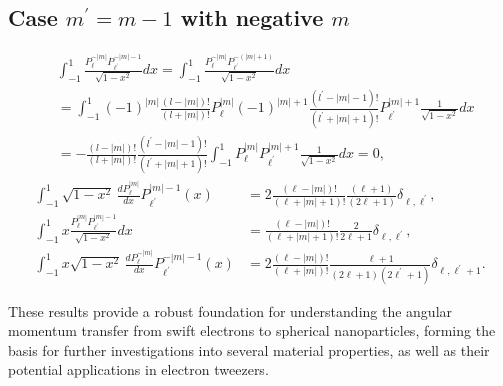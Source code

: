 \subsection{Case $m^{\prime}= m - 1$ with negative $m$}
\begin{align}
    &\int_{-1}^{1} \frac{P_{\ell}^{-|m|} P_{\ell^{\prime}}^{-|m|-1}}{\sqrt{1-x^2}} dx = \int_{-1}^{1} \frac{P_{\ell}^{-|m|} P_{\ell^{\prime}}^{-(|m|+1)}}{\sqrt{1-x^2}} dx \\
    &= \int_{-1}^{1} (-1)^|m| \frac{(l-|m|)!}{(l+|m|)!} P_{\ell}^{|m|} (-1)^{|m|+1} \frac{(l^{\prime}-|m|-1)!}{(l^{\prime}+|m|+1)!} P_{\ell^{\prime}}^{|m|+1} \frac{1}{\sqrt{1-x^2}} dx \\
    &= - \frac{(l-|m|)!}{(l+|m|)!} \frac{(l^{\prime}-|m|-1)!}{(l^{\prime}+|m|+1)!}  \int_{-1}^{1}   P_{\ell}^{|m|} P_{\ell^{\prime}}^{|m|+1} \frac{1}{\sqrt{1-x^2}} dx =0, 
\end{align}
\begin{align}
    \int_{-1}^{1} \sqrt{1-x^2} \,\frac{dP_{\ell}^{|m|}}{dx} P_{\ell^{\prime}}^{|m|-1} (x) &= 2 \frac{(\ell-|m|)!}{(\ell+|m|+1)!}\frac{(\ell+1)}{(2\ell+1)}\delta_{\ell,\ell^{\prime}},\\
    \int_{-1}^{1} x \frac{P_{\ell}^{|m|} P_{\ell^{\prime}}^{|m|-1}}{\sqrt{1-x^2}} dx &= \frac{(\ell-|m|)!}{(\ell+|m|+1)!}\frac{2}{2\ell+1}\delta_{\ell,\ell^{\prime}},\\
    \int_{-1}^{1} x\sqrt{1-x^2} \,\frac{dP_{\ell}^{-|m|}}{dx} P_{\ell^{\prime}}^{-|m|-1} (x) &= 2 \frac{(\ell-|m|)!}{(\ell+|m|)!}\frac{\ell+1}{(2\ell+1)(2\ell^{\prime}+1)} \delta_{\ell,\ell^{\prime}+1}.
\end{align}

These results provide a robust foundation for understanding the angular momentum transfer from swift electrons to spherical nanoparticles, forming the basis for further investigations into several material properties, as well as their potential applications in electron tweezers.